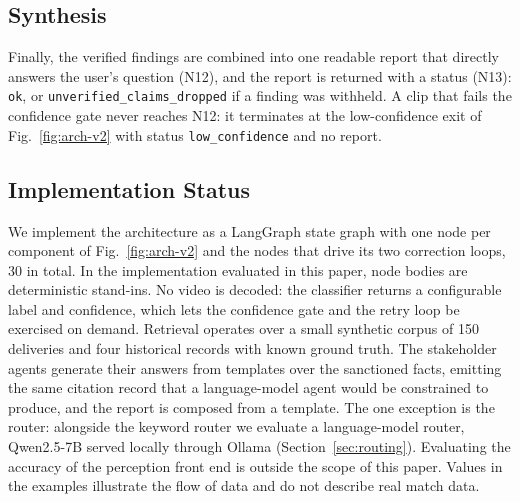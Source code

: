 \subsection{Synthesis}
Finally, the verified findings are combined into one readable report that directly answers the user's question (N12), and the report is returned with a status (N13): \texttt{ok}, or \texttt{unverified\_claims\_dropped} if a finding was withheld. A clip that fails the confidence gate never reaches N12: it terminates at the low-confidence exit of Fig.~\ref{fig:arch-v2} with status \texttt{low\_confidence} and no report.

\subsection{Implementation Status}
We implement the architecture as a LangGraph state graph with one node per component of Fig.~\ref{fig:arch-v2} and the nodes that drive its two correction loops, 30 in total. In the implementation evaluated in this paper, node bodies are deterministic stand-ins. No video is decoded: the classifier returns a configurable label and confidence, which lets the confidence gate and the retry loop be exercised on demand. Retrieval operates over a small synthetic corpus of 150 deliveries and four historical records with known ground truth. The stakeholder agents generate their answers from templates over the sanctioned facts, emitting the same citation record that a language-model agent would be constrained to produce, and the report is composed from a template. The one exception is the router: alongside the keyword router we evaluate a language-model router, Qwen2.5-7B served locally through Ollama (Section~\ref{sec:routing}). Evaluating the accuracy of the perception front end is outside the scope of this paper. Values in the examples illustrate the flow of data and do not describe real match data.
